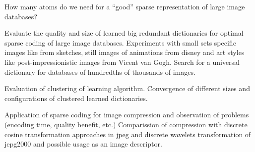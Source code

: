 How many atoms do we need  for a ``good'' sparse representation of large image databases?

Evaluate the quality and size of learned big redundant dictionaries for optimal sparse coding of large image databases.
Experiments with small sets specific images like from sketches, still images of animations from disney and art styles like post-impressionistic images from Vicent van Gogh.
Search for a universal dictionary for databases of hundredths of thousands of images.

Evaluation of clustering of learning algorithm.
Convergence of different sizes and configurations of clustered learned dictionaries. 

Application of sparse coding for image compression and observation of problems (encoding time, quality benefit, etc.)
Comparission of compression with discrete cosine transformation approaches in jpeg and discrete wavelets transformation of jepg2000 and possible usage as an image descriptor.








